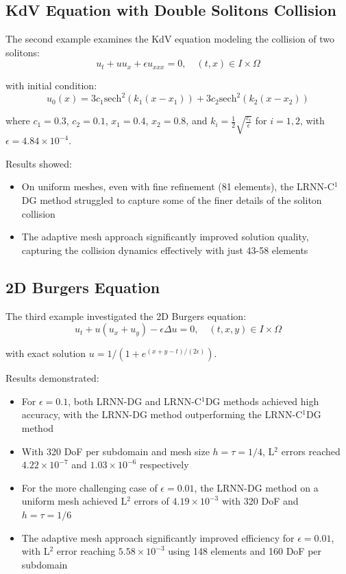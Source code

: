 \documentclass[11pt,a4paper]{article}
\begin{document}
\subsection{KdV Equation with Double Solitons Collision}

The second example examines the KdV equation modeling the collision of two solitons:
\begin{equation}
u_t + u u_x + \epsilon u_{xxx} = 0, \quad (t, x) \in I \times \Omega
\end{equation}

with initial condition:
\begin{equation}
u_0(x) = 3c_1 \text{sech}^2(k_1(x - x_1)) + 3c_2 \text{sech}^2(k_2(x - x_2))
\end{equation}

where $c_1 = 0.3$, $c_2 = 0.1$, $x_1 = 0.4$, $x_2 = 0.8$, and $k_i = \frac{1}{2}\sqrt{\frac{c_i}{\epsilon}}$ for $i = 1, 2$, with $\epsilon = 4.84 \times 10^{-4}$.

Results showed:
\begin{itemize}
    \item On uniform meshes, even with fine refinement (81 elements), the LRNN-C$^1$DG method struggled to capture some of the finer details of the soliton collision
    \item The adaptive mesh approach significantly improved solution quality, capturing the collision dynamics effectively with just 43-58 elements
\end{itemize}

\subsection{2D Burgers Equation}

The third example investigated the 2D Burgers equation:
\begin{equation}
u_t + u(u_x + u_y) - \epsilon \Delta u = 0, \quad (t, x, y) \in I \times \Omega
\end{equation}

with exact solution $u = 1/(1 + e^{(x+y-t)/(2\epsilon)})$.

Results demonstrated:
\begin{itemize}
    \item For $\epsilon = 0.1$, both LRNN-DG and LRNN-C$^1$DG methods achieved high accuracy, with the LRNN-DG method outperforming the LRNN-C$^1$DG method
    \item With 320 DoF per subdomain and mesh size $h = \tau = 1/4$, L$^2$ errors reached $4.22 \times 10^{-7}$ and $1.03 \times 10^{-6}$ respectively
    \item For the more challenging case of $\epsilon = 0.01$, the LRNN-DG method on a uniform mesh achieved L$^2$ errors of $4.19 \times 10^{-3}$ with 320 DoF and $h = \tau = 1/6$
    \item The adaptive mesh approach significantly improved efficiency for $\epsilon = 0.01$, with L$^2$ error reaching $5.58 \times 10^{-3}$ using 148 elements and 160 DoF per subdomain
\end{itemize}
\end{document}
